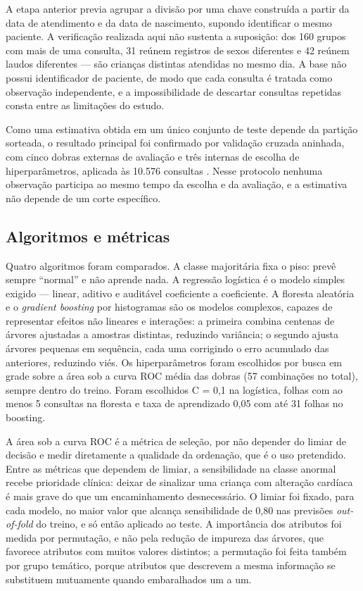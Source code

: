 \documentclass[conference]{IEEEtran}
\begin{document}
A etapa anterior previa agrupar a divisão por uma chave construída a partir da data de atendimento e da data de nascimento, supondo identificar o mesmo paciente. A verificação realizada aqui não sustenta a suposição: dos 160 grupos com mais de uma consulta, 31 reúnem registros de sexos diferentes e 42 reúnem laudos diferentes --- são crianças distintas atendidas no mesmo dia. A base não possui identificador de paciente, de modo que cada consulta é tratada como observação independente, e a impossibilidade de descartar consultas repetidas consta entre as limitações do estudo.

Como uma estimativa obtida em um único conjunto de teste depende da partição sorteada, o resultado principal foi confirmado por validação cruzada aninhada, com cinco dobras externas de avaliação e três internas de escolha de hiperparâmetros, aplicada às 10.576 consultas \cite{varma}. Nesse protocolo nenhuma observação participa ao mesmo tempo da escolha e da avaliação, e a estimativa não depende de um corte específico.

\subsection{Algoritmos e métricas}
Quatro algoritmos foram comparados. A classe majoritária fixa o piso: prevê sempre ``normal'' e não aprende nada. A regressão logística é o modelo simples exigido --- linear, aditivo e auditável coeficiente a coeficiente. A floresta aleatória \cite{breiman} e o \textit{gradient boosting} por histogramas \cite{friedman} são os modelos complexos, capazes de representar efeitos não lineares e interações: a primeira combina centenas de árvores ajustadas a amostras distintas, reduzindo variância; o segundo ajusta árvores pequenas em sequência, cada uma corrigindo o erro acumulado das anteriores, reduzindo viés. Os hiperparâmetros foram escolhidos por busca em grade sobre a área sob a curva ROC média das dobras (57 combinações no total), sempre dentro do treino. Foram escolhidos C = 0,1 na logística, folhas com ao menos 5 consultas na floresta e taxa de aprendizado 0,05 com até 31 folhas no boosting.

A área sob a curva ROC é a métrica de seleção, por não depender do limiar de decisão e medir diretamente a qualidade da ordenação, que é o uso pretendido. Entre as métricas que dependem de limiar, a sensibilidade na classe anormal recebe prioridade clínica: deixar de sinalizar uma criança com alteração cardíaca é mais grave do que um encaminhamento desnecessário. O limiar foi fixado, para cada modelo, no maior valor que alcança sensibilidade de 0,80 nas previsões \textit{out-of-fold} do treino, e só então aplicado ao teste. A importância dos atributos foi medida por permutação, e não pela redução de impureza das árvores, que favorece atributos com muitos valores distintos; a permutação foi feita também por grupo temático, porque atributos que descrevem a mesma informação se substituem mutuamente quando embaralhados um a um.
\end{document}
